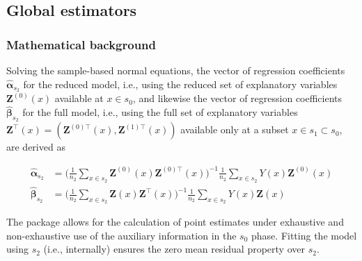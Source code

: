 \documentclass[article]{jss}
\begin{document}
\subsection{Global estimators}
\label{sec:glob_est_3p}


\subsubsection{Mathematical background}


Solving the sample-based normal equations, the vector of regression coefficients $\hat{\pmb{\alpha}}_{s_2}$ for the reduced model, i.e., using the reduced set of explanatory variables $\pmb{Z}^{(0)}(x)$ available at $x \in s_0$, and likewise the vector of regression coefficients $\hat{\pmb{\beta}}_{s_2}$ for the full model, i.e., using the full set of explanatory variables $\pmb{Z}^{\top}(x)=(\pmb{Z}^{(0)\top}(x),\pmb{Z}^{(1)\top}(x))$ available only at a subset $x \in s_1 \subset s_0$, are derived as

\begin{subequations}\label{eq:normequ_3p}
\begin{align}
\hat{\pmb{\alpha}}_{s_2}&=\Big(\frac{1}{n_2}\sum_{x\in{s}_2}\pmb{Z}^{(0)}(x)\pmb{Z}^{(0)\top}(x)
\Big)^{-1}\frac{1}{n_2}\sum_{x\in{s}_2}Y(x)\pmb{Z}^{(0)}(x)  \label{eq:normequ_redmod} \\
\hat{\pmb{\beta}}_{s_2}&=\Big(\frac{1}{n_2}\sum_{x\in{s}_2}\pmb{Z}(x)\pmb{Z}^{\top}(x)
\Big)^{-1}\frac{1}{n_2}\sum_{x\in{s}_2}Y(x)\pmb{Z}(x) \label{eq:normequ_fullmod}
\end{align}
\end{subequations}

The package allows for the calculation of point estimates under exhaustive and non-exhaustive use of the auxiliary information in the $s_0$ phase. Fitting the model using $s_2$ (i.e., internally) ensures the zero mean residual property over $s_2$.
\end{document}
